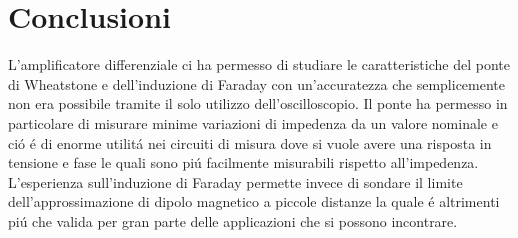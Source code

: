 \documentclass{article}
\begin{document}

\newpage

\newpage


\newpage

\section{Conclusioni}
L'amplificatore differenziale ci ha permesso di studiare le caratteristiche del ponte di Wheatstone e dell'induzione di Faraday con un'accuratezza che semplicemente non era possibile tramite il solo utilizzo dell'oscilloscopio. Il ponte ha permesso in particolare di misurare minime variazioni di impedenza da un valore nominale e ci\'o \'e di enorme utilit\'a nei circuiti di misura dove si vuole avere una risposta in tensione e fase le quali sono pi\'u facilmente misurabili rispetto all'impedenza. L'esperienza sull'induzione di Faraday permette invece di sondare il limite dell'approssimazione di dipolo magnetico a piccole distanze la quale \'e altrimenti pi\'u che valida per gran parte delle applicazioni che si possono incontrare.
\end{document}
